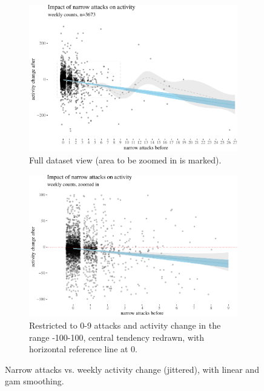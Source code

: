 \documentclass[10pt,]{scrartcl}
\begin{document}
\footnotesize

\normalsize

\begin{figure}
\begin{subfigure}[b]{0.95\textwidth}

\begin{center}\includegraphics[width=1\linewidth]{redditAnalysisWalkthrough_files/figure-latex/unnamed-chunk-8-1} \end{center}
\caption{Full dataset view (area to be zoomed in is marked).}
\end{subfigure}

\vspace{3mm}
 
\begin{subfigure}[b]{0.95\textwidth}

\begin{center}\includegraphics[width=1\linewidth]{redditAnalysisWalkthrough_files/figure-latex/unnamed-chunk-9-1} \end{center}
\caption{Restricted to 0-9 attacks and activity change in the range -100-100, central tendency redrawn, with horizontal reference line at 0.}
\end{subfigure}
\caption{Narrow attacks vs. weekly activity change (jittered), with  linear and gam smoothing.}
\label{fig:highPlots}
\end{figure}
\end{document}
